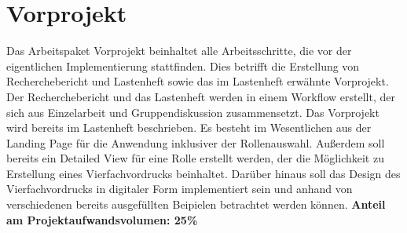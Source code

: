 \section{Vorprojekt} 
Das Arbeitspaket Vorprojekt beinhaltet alle Arbeitsschritte, die vor der 
eigentlichen Implementierung stattfinden. Dies betrifft die Erstellung von 
Recherchebericht und Lastenheft sowie das im Lastenheft erwähnte Vorprojekt. 
Der Recherchebericht und das Lastenheft werden in einem Workflow erstellt, 
der sich aus Einzelarbeit und Gruppendiskussion zusammensetzt. 
Das Vorprojekt wird bereits im Lastenheft beschrieben. Es besteht 
im Wesentlichen aus der Landing Page für die Anwendung inklusiver der 
Rollenauswahl. Außerdem soll bereits ein Detailed View für eine Rolle 
erstellt werden, der die Möglichkeit zu Erstellung eines Vierfachvordrucks 
beinhaltet. Darüber hinaus soll das Design des Vierfachvordrucks in digitaler 
Form implementiert sein und anhand von verschiedenen bereits ausgefüllten 
Beipielen betrachtet werden können.
\textbf{Anteil am Projektaufwandsvolumen: 25\%}